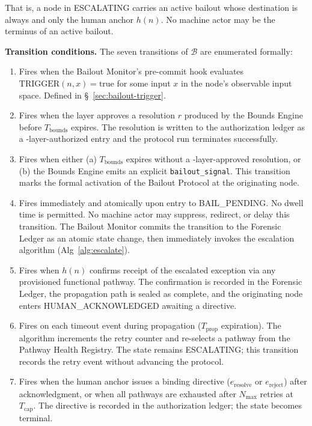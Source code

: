 That is, a node in ESCALATING carries an active bailout whose destination is always and only the human anchor $h(n)$. No machine actor may be the terminus of an active bailout.

\bigskip
\noindent\textbf{Transition conditions.} The seven transitions of $\mathcal{B}$ are enumerated formally:

\begin{enumerate}\itemsep=0pt
\item[T1 --- \texttt{IDLE $\rightarrow$ BOUNDED}:] Fires when the Bailout Monitor's pre-commit hook evaluates $\text{TRIGGER}(n, x) = \text{true}$ for some input $x$ in the node's observable input space. Defined in \S~\ref{sec:bailout-trigger}.

\item[T2 --- \texttt{BOUNDED $\rightarrow$ IDLE}:] Fires when the \fact{} layer approves a resolution $r$ produced by the Bounds Engine before $T_{\text{bounds}}$ expires. The resolution is written to the authorization ledger as a \fact-layer-authorized entry and the protocol run terminates successfully.

\item[T3 --- \texttt{BOUNDED $\rightarrow$ BAIL\_PENDING}:] Fires when either (a) $T_{\text{bounds}}$ expires without a \fact-layer-approved resolution, or (b) the Bounds Engine emits an explicit \texttt{bailout\_signal}. This transition marks the formal activation of the Bailout Protocol at the originating node.

\item[T4 --- \texttt{BAIL\_PENDING $\rightarrow$ ESCALATING}:] Fires immediately and atomically upon entry to BAIL\_PENDING. No dwell time is permitted. No machine actor may suppress, redirect, or delay this transition. The Bailout Monitor commits the transition to the Forensic Ledger as an atomic state change, then immediately invokes the escalation algorithm (Alg~\ref{alg:escalate}).

\item[T5 --- \texttt{ESCALATING $\rightarrow$ HUMAN\_ACKNOWLEDGED}:] Fires when $h(n)$ confirms receipt of the escalated exception via any provisioned functional pathway. The confirmation is recorded in the Forensic Ledger, the propagation path is sealed as complete, and the originating node enters HUMAN\_ACKNOWLEDGED awaiting a directive.

\item[T6 --- \texttt{ESCALATING $\rightarrow$ ESCALATING}:] Fires on each timeout event during propagation ($T_{\text{prop}}$ expiration). The algorithm increments the retry counter and re-selects a pathway from the Pathway Health Registry. The state remains ESCALATING; this transition records the retry event without advancing the protocol.

\item[T7 --- \texttt{ESCALATING $\rightarrow$ RESOLVED}:] Fires when the human anchor issues a binding directive ($e_{\text{resolve}}$ or $e_{\text{reject}}$) after acknowledgment, or when all pathways are exhausted after $N_{\max}$ retries at $T_{\text{cap}}$. The directive is recorded in the authorization ledger; the state becomes terminal.
\end{enumerate}

